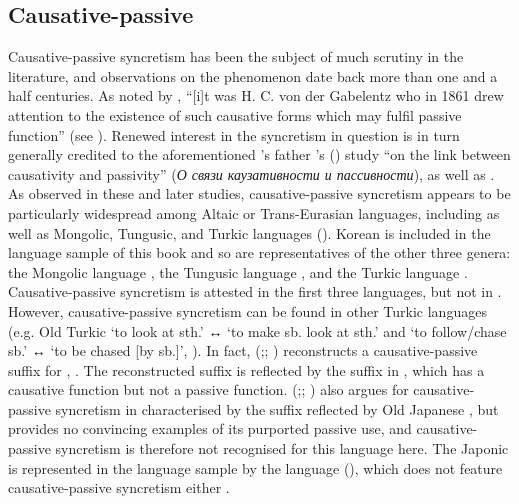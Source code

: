 \subsection{Causative-passive} \label{sec:simple-syncretism:caus-pass}
Causative-passive syncretism has been the subject of much scrutiny in the literature, and observations on the phenomenon date back more than one and a half centuries. As noted by \cite[4f.]{nedyalkov:1991}, “[i]t was H. C. von der Gabelentz who in 1861 drew attention to the existence of such causative forms which may fulfil passive function” (see \citealt[516--529]{von-der-gabelentz:1861}). Renewed interest in the syncretism in question is in turn generally credited to the aforementioned \citeauthor{nedyalkov:1991}’s father \citeauthor{nedjalkov:1964}’s (\citeyear{nedjalkov:1964}) study “on the link between causativity and passivity” (\textit{О связи каузативности и пассивности}), as well as \cite[38ff.]{nedjalkov:silnickij:1969}. As observed in these and later studies, causative-passive syncretism appears to be particularly widespread among Altaic or Trans-Eurasian languages, including  as well as Mongolic, Tungusic, and Turkic languages (\citealt{robbeets:2007}). Korean is included in the language sample of this book and so are representatives of the other three genera: the Mongolic language , the Tungusic language , and the Turkic language . Causative-passive syncretism is attested in the first three languages, but not in  \citep{zinnatullina:1993, burbiel:2018}. However, causative-passive syncretism can be found in other Turkic languages (e.g. Old Turkic  ‘to look at sth.’ ↔  ‘to make sb. look at sth.’ and  ‘to follow/chase sb.’ ↔  ‘to be chased [by sb.]’, \citealt[291f.]{robbeets:2015}). In fact, \citeauthor{robbeets:2007} (\citeyear[178ff.]{robbeets:2007};; \citeyear[290ff.]{robbeets:2015}) reconstructs a causative-passive suffix for , . The reconstructed suffix is reflected by the suffix  in , which has a causative function but not a passive function. \citeauthor{robbeets:2007} (\citeyear[165f.]{robbeets:2007};; \citeyear[276f.]{robbeets:2015}) also argues for causative-passive syncretism in  characterised by the suffix  reflected by Old Japanese , but provides no convincing examples of its purported passive use, and causative-passive syncretism is therefore not recognised for this language here. The Japonic  is represented in the language sample by the language  (), which does not feature causative-passive syncretism either \citep{shimoji:2008}.

